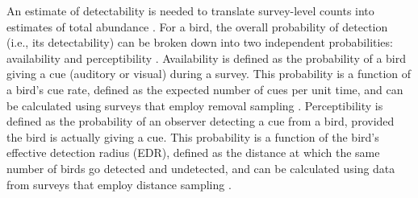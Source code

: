 \par An estimate of detectability is needed to translate survey-level counts into estimates of total abundance \citep{rosenberg_setting_2005, stanton_estimating_2019}. For a bird, the overall probability of detection (i.e., its detectability) can be broken down into two independent probabilities: availability and perceptibility \citep{marsh_correcting_1989, johnson_defense_2008}. Availability is defined as the probability of a bird giving a cue (auditory or visual) during a survey. This probability is a function of a bird’s cue rate, defined as the expected number of cues per unit time, and can be calculated using surveys that employ removal sampling \citep{barker_statistical_1995, farnsworth_removal_2002, alldredge_time--detection_2007}. Perceptibility is defined as the probability of an observer detecting a cue from a bird, provided the bird is actually giving a cue. This probability is a function of the bird’s effective detection radius (EDR), defined as the distance at which the same number of birds go detected and undetected, and can be calculated using data from surveys that employ distance sampling \citep{buckland_introduction_2001, buckland_distance_2015}.



